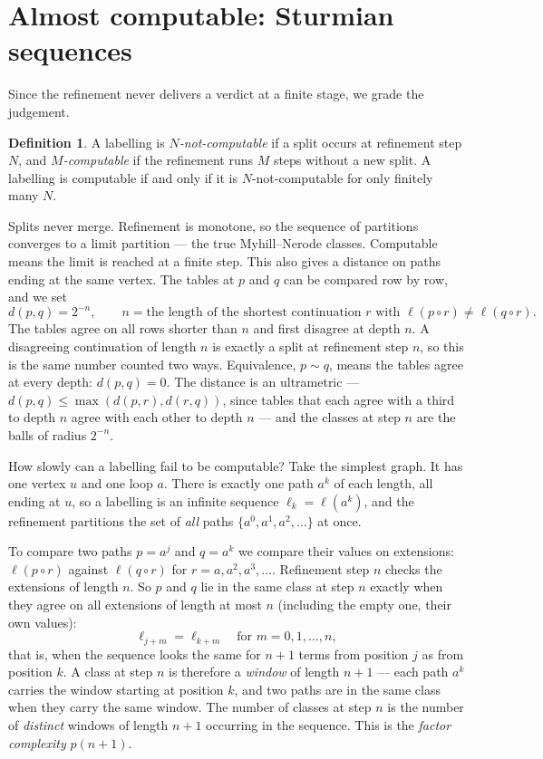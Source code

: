 \documentclass[11pt, a4paper]{article}
\theoremstyle{definition}
\newtheorem{definition}{Definition}[section]
\theoremstyle{plain}
\begin{document}
\section{Almost computable: Sturmian sequences}\label{sec:sturmian}

Since the refinement never delivers a verdict at a finite stage, we
grade the judgement.

\begin{definition}
\label{def:m-computable}
A labelling is \emph{$N$-not-computable} if a split occurs at
refinement step $N$, and \emph{$M$-computable} if the refinement runs
$M$ steps without a new split.  A labelling is computable if and only
if it is $N$-not-computable for only finitely many $N$.
\end{definition}

Splits never merge.  Refinement is monotone, so the sequence of
partitions converges to a limit partition --- the true Myhill--Nerode
classes.  Computable means the limit is reached at a finite step.
This also gives a distance on paths ending at the same vertex.  The
tables at $p$ and $q$ can be compared row by row, and we set
\[
  d(p,q) = 2^{-n}, \qquad
  n = \text{the length of the shortest continuation } r
      \text{ with } \ell(p \circ r) \neq \ell(q \circ r).
\]
The tables agree on all rows shorter than $n$ and first disagree at
depth $n$.  A disagreeing continuation of length $n$ is exactly a
split at refinement step $n$, so this is the same number counted two
ways.  Equivalence, $p \sim q$, means the tables agree at every
depth: $d(p,q) = 0$.  The distance is an ultrametric ---
$d(p,q) \leq \max(d(p,r), d(r,q))$, since tables that each agree with
a third to depth $n$ agree with each other to depth $n$ --- and the
classes at step $n$ are the balls of radius $2^{-n}$.

How slowly can a labelling fail to be computable?  Take the simplest
graph.  It has one vertex $u$ and one loop $a$.  There is exactly one path
$a^k$ of each length, all ending at $u$, so a labelling is an
infinite sequence $\ell_k = \ell(a^k)$, and the refinement partitions
the set of \emph{all} paths $\{a^0, a^1, a^2, \dots\}$ at once.

To compare two paths $p = a^j$ and $q = a^k$ we compare their values
on extensions: $\ell(p \circ r)$ against $\ell(q \circ r)$ for
$r = a, a^2, a^3, \dots$.  Refinement step $n$ checks the extensions
of length $n$.  So $p$ and $q$ lie in the same class at step $n$
exactly when they agree on all extensions of length at most $n$
(including the empty one, their own values):
\[
  \ell_{j+m} = \ell_{k+m} \quad \text{for } m = 0, 1, \dots, n,
\]
that is, when the sequence looks the same for $n+1$ terms from
position $j$ as from position $k$.  A class at step $n$ is therefore
a \emph{window} of length $n+1$ --- each path $a^k$ carries the
window starting at position $k$, and two paths are in the same class
when they carry the same window.  The number of classes at step $n$
is the number of \emph{distinct} windows of length $n+1$ occurring
in the sequence.  This is the \emph{factor complexity} $p(n+1)$.
\end{document}

